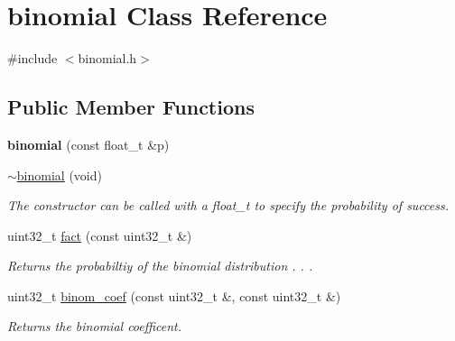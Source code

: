 \hypertarget{classbinomial}{\section{binomial Class Reference}
\label{classbinomial}
}


{\ttfamily \#include $<$binomial.\-h$>$}

\subsection*{Public Member Functions}
\begin{DoxyCompactItemize}
\item 
\hypertarget{classbinomial_add79fb768a6efc4b4fb943687e34f99e}{{\bfseries binomial} (const float\-\_\-t \&p)}\label{classbinomial_add79fb768a6efc4b4fb943687e34f99e}

\item 
\hypertarget{classbinomial_aa7170ce1cabd59f898e4b619ce97ccc8}{\hyperlink{classbinomial_aa7170ce1cabd59f898e4b619ce97ccc8}{$\sim$binomial} (void)}\label{classbinomial_aa7170ce1cabd59f898e4b619ce97ccc8}

\begin{DoxyCompactList}\small\item\em The constructor can be called with a float\-\_\-t to specify the probability of success. \end{DoxyCompactList}\item 
\hypertarget{classbinomial_aba6c2cff03e17edaa79ac38beba97df8}{uint32\-\_\-t \hyperlink{classbinomial_aba6c2cff03e17edaa79ac38beba97df8}{fact} (const uint32\-\_\-t \&)}\label{classbinomial_aba6c2cff03e17edaa79ac38beba97df8}

\begin{DoxyCompactList}\small\item\em Returns the probabiltiy of the binomial distribution . . . \end{DoxyCompactList}\item 
\hypertarget{classbinomial_a829c87611cdd314ef3bdac88133c0d80}{uint32\-\_\-t \hyperlink{classbinomial_a829c87611cdd314ef3bdac88133c0d80}{binom\-\_\-coef} (const uint32\-\_\-t \&, const uint32\-\_\-t \&)}\label{classbinomial_a829c87611cdd314ef3bdac88133c0d80}

\begin{DoxyCompactList}\small\item\em Returns the binomial coefficent. \end{DoxyCompactList}\end{DoxyCompactItemize}
